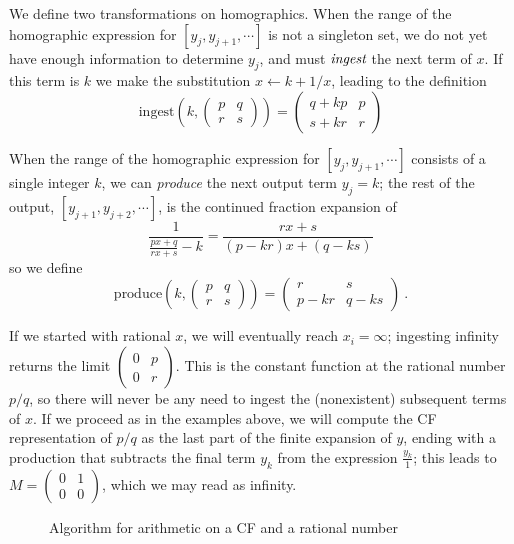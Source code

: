 \documentclass[11pt, oneside]{amsart}   	%
\newcommand{\pqrs}{\left(
\begin{smallmatrix} 
p & q\\ 
r & s 
\end{smallmatrix}
\right)}
\newcommand{\homographic}[4]{\begin{pmatrix} #1 & #2\\ #3 & #4 \end{pmatrix}}
\renewcommand{\:}{\negthickspace:\negthickspace}
\begin{document}
We define two transformations on homographics. When the range of the homographic expression for $[y_j,y_{j+1},\cdots]$ is not a
singleton set, we do not yet have enough information to determine $y_j$, and must $\emph{ingest}$ the next term of $x$. If this term
is $k$ we make the substitution $x \leftarrow k + 1/x$, leading to the definition
\[
\mbox{ingest}(k,\pqrs) = \homographic{q+kp}{p}{s+kr}{r}%
\]

When the range of the homographic expression for $[y_j,y_{j+1},\cdots]$ consists of a single integer $k$, we can \emph{produce}
the next output term $y_j = k$; the rest of the output, $[y_{j+1},y_{j+2},\cdots]$, is the continued fraction expansion of
\[
\frac{1}{\frac{px+q}{rx+s}-k} = \frac{rx+s}{(p-kr)x + (q-ks)}
\] 
so we define 
\[
\mbox{produce}(k,\pqrs) = \homographic{r}{s}{p-kr}{q-ks}\ .
\]

If we started with rational $x$, we will eventually reach $x_i = \infty$; ingesting infinity returns the limit ${\left(
\begin{smallmatrix} 
0 & p\\ 
0 & r
\end{smallmatrix}
\right)}$.
This is the constant function at the rational number $p/q$, so there will never be any need to ingest the (nonexistent) subsequent 
terms of $x$. If we proceed as in the examples above, we will compute the CF representation of $p/q$ as the last part of the finite
expansion of $y$, ending with a production that subtracts the final term $y_k$ from the expression $\frac{y_k}{1}$; this leads to
$M=\left(\begin{smallmatrix}0 & 1 \\ 0 & 0\end{smallmatrix}\right)$, which we may read as infinity.

\begin{figure}\label{fig:oneCFarith}
\begin{algorithmic}
 
 
\STATE{$M \gets \pqrs$} 
           \ENDWHILE
\ENDWHILE
\end{algorithmic}
\caption{Algorithm for arithmetic on a CF and a rational number}
\end{figure}
\end{document}
